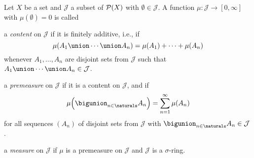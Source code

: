 \documentclass[article, a4paper, 11pt, oneside]{memoir}
\numberwithin{equation}{chapter}
\newcommand{\calJ}{\mathcal{J}}
\begin{document}
\begin{definition}
    Let $X$ be a set and $\calJ$ a subset of $\mathcal{P}(X)$ with $\emptyset \in \calJ$. A function $\mu \colon \calJ \to [0,\infty]$ with $\mu(\emptyset) = 0$ is called
    \begin{enumdef}
        \item a \emph{content} on $\calJ$ if it is finitely additive, i.e., if
        \begin{equation*}
            \mu(A_1 \union \cdots \union A_n)
                = \mu(A_1) + \cdots + \mu(A_n)
        \end{equation*}
        whenever $A_1, \ldots, A_n$ are disjoint sets from $\calJ$ such that $A_1 \union \cdots \union A_n \in \calJ$.
        
        \item a \emph{premeasure} on $\calJ$ if it is a content on $\calJ$, and if
        \begin{equation*}
            \mu \Bigl( \bigunion_{n \in \naturals} A_n \Bigr)
                = \sum_{n=1}^\infty \mu(A_n)
        \end{equation*}
        for all sequences $(A_n)$ of disjoint sets from $\calJ$ with $\bigunion_{n \in \naturals} A_n \in \calJ$.

        \item a \emph{measure} on $\calJ$ if $\mu$ is a premeasure on $\calJ$ and $\calJ$ is a $\sigma$-ring.
    \end{enumdef}
\end{definition}
\end{document}
